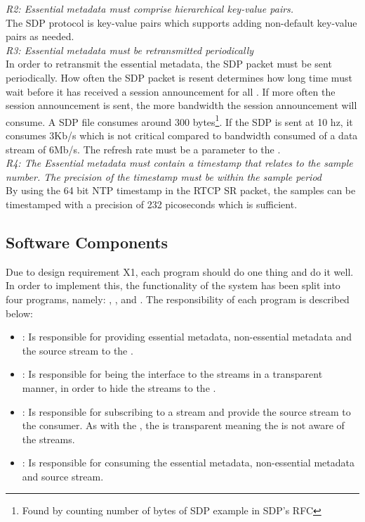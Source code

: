 \noindent \textit{R2: Essential metadata must comprise hierarchical key-value pairs.}\\
The SDP protocol is key-value pairs which supports adding non-default key-value pairs as needed. \\

\noindent \textit{R3: Essential metadata must be retransmitted periodically}\\
In order to retransmit the essential metadata, the SDP packet must be sent periodically. How often the SDP packet is resent determines how long time  must wait before    it has received a session announcement for all . If more often the session announcement is sent, the more bandwidth the session announcement will consume. A SDP file consumes around 300 bytes\footnote{Found by counting number of bytes of SDP example in SDP's RFC}. If the SDP is sent at 10 hz, it consumes 3Kb/s which is not critical compared to bandwidth consumed of a data stream of 6Mb/s. The refresh rate must be a parameter to the . \\

\noindent \textit{R4: The Essential metadata must contain a timestamp that relates to the sample number. The precision of the timestamp must be within the sample period}\\
By using the 64 bit NTP timestamp in the RTCP SR packet, the samples can be timestamped with a precision of 232 picoseconds\citep{RFC5905} which is sufficient.



\subsection{Software Components}
Due to design requirement X1, each program should do one thing and do it well.
In order to implement this, the functionality of the system has been split into four programs, namely: \pub{}, \sub{}, \pro{} and \con{}. The responsibility of each program is described below:

\begin{itemize}
	\item \pro: Is responsible for providing essential metadata, non-essential metadata and the source stream to the \pub.
	
	\item \pub: Is responsible for being the interface to the streams in a transparent manner, in order to hide the streams to the \pro. 
	
	\item \sub: Is responsible for subscribing to a stream and provide the source stream to the consumer. As with the \pub, the \sub is transparent meaning the \con is not aware of the streams. 
	
	\item \con: Is responsible for consuming the essential metadata, non-essential metadata and source stream.
\end{itemize}


